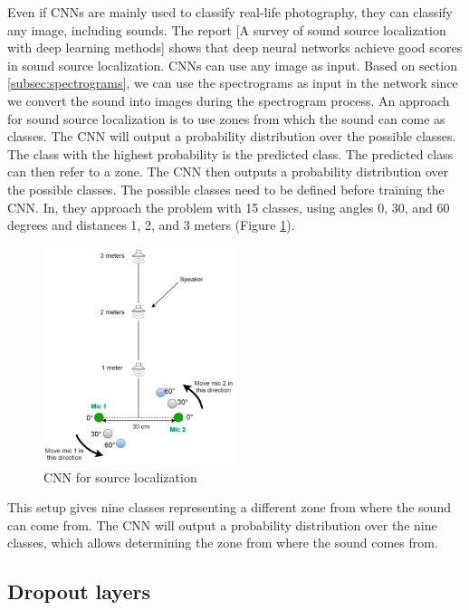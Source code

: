 Even if CNNs are mainly used to classify real-life photography, they can classify any image, including sounds. The report [A survey of sound source localization with deep learning methods]\cite{Grumiaux_2022} shows that deep neural networks achieve good scores in sound source localization. CNNs can use any image as input. Based on section \ref*{subsec:spectrograms}, we can use the spectrograms as input in the network since we convert the sound into images during the spectrogram process. An approach for sound source localization is to use zones from which the sound can come as classes. The CNN will output a probability distribution over the possible classes. The class with the highest probability is the predicted class. The predicted class can then refer to a zone. The CNN then outputs a probability distribution over the possible classes. The possible classes need to be defined before training the CNN. In\cite{s20010172}, they approach the problem with 15 classes, using angles 0, 30, and 60 degrees and distances 1, 2, and 3 meters (Figure \ref*{fig:Yiwere_classes}).

\begin{figure}[H]
    \centering
    \includegraphics[width=0.5\textwidth]{../Images/Yiwere_classes.png}
    \caption{CNN for source localization}
    \label{fig:Yiwere_classes}
\end{figure}

This setup gives nine classes representing a different zone from where the sound can come from. The CNN will output a probability distribution over the nine classes, which allows determining the zone from where the sound comes from.

\subsection{Dropout layers}

